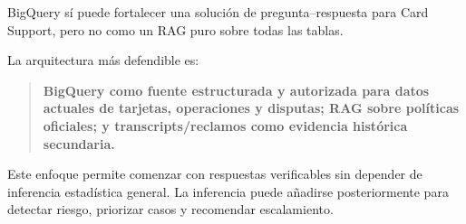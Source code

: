 \documentclass[11pt,a4paper]{article}
\begin{document}
BigQuery sí puede fortalecer una solución de pregunta--respuesta para Card Support, pero no como un RAG puro sobre todas las tablas.

La arquitectura más defendible es:

\begin{quote}
\textbf{BigQuery como fuente estructurada y autorizada para datos actuales de tarjetas, operaciones y disputas; RAG sobre políticas oficiales; y transcripts/reclamos como evidencia histórica secundaria.}
\end{quote}

Este enfoque permite comenzar con respuestas verificables sin depender de inferencia estadística general. La inferencia puede añadirse posteriormente para detectar riesgo, priorizar casos y recomendar escalamiento.
\end{document}
